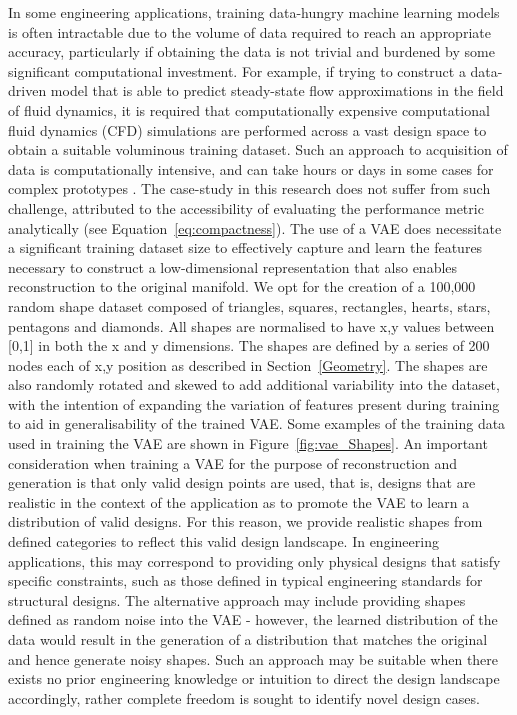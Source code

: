 \documentclass{article}
\begin{document}
In some engineering applications, training data-hungry machine learning models is often intractable due to the volume of data required to reach an appropriate accuracy, particularly if obtaining the data is not trivial and burdened by some significant computational investment. For example, if trying to construct a data-driven model that is able to predict steady-state flow approximations in the field of fluid dynamics, it is required that computationally expensive computational fluid dynamics (CFD) simulations are performed across a vast design space to obtain a suitable voluminous training dataset. Such an approach to acquisition of data is computationally intensive, and can take hours or days in some cases for complex prototypes \citep{guo2016convolutional}. The case-study in this research does not suffer from such challenge, attributed to the accessibility of evaluating the performance metric analytically (see Equation~\ref{eq:compactness}).
The use of a VAE does necessitate a significant training dataset size to effectively capture and learn the features necessary to construct a low-dimensional representation that also enables reconstruction to the original manifold. We opt for the creation of a 100,000 random shape dataset composed of triangles, squares, rectangles, hearts, stars, pentagons and diamonds. All shapes are normalised to have x,y values between [0,1] in both the x and y dimensions. The shapes are defined by a series of 200 nodes each of x,y position as described in Section~\ref{Geometry}. The shapes are also randomly rotated and skewed to add additional variability into the dataset, with the intention of expanding the variation of features present during training to aid in generalisability of the trained VAE. Some examples of the training data used in training the VAE are shown in Figure~\ref{fig:vae_Shapes}. An important consideration when training a VAE for the purpose of reconstruction and generation is that only valid design points are used, that is, designs that are realistic in the context of the application \citep{Huang2022} as to promote the VAE to learn a distribution of valid designs. For this reason, we provide realistic shapes from defined categories to reflect this valid design landscape. In engineering applications, this may correspond to providing only physical designs that satisfy specific constraints, such as those defined in typical engineering standards for structural designs. The alternative approach may include providing shapes defined as random noise into the VAE - however, the learned distribution of the data would result in the generation of a distribution that matches the original and hence generate noisy shapes. Such an approach may be suitable when there exists no prior engineering knowledge or intuition to direct the design landscape accordingly, rather complete freedom is sought to identify novel design cases.
\end{document}

